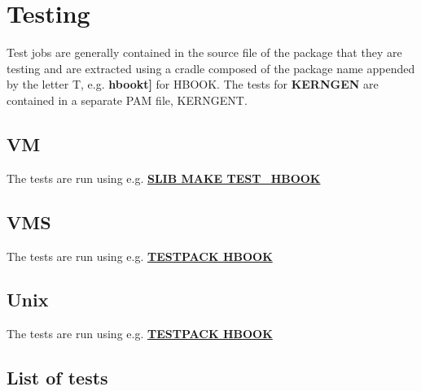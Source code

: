 \chapter{Testing}

Test jobs are generally contained in the source file of the
package that they are testing and are extracted using a
cradle composed of the package name appended by the letter T,
e.g. {\bf hbookt]} for HBOOK. The tests for {\bf KERNGEN}
are contained in a separate PAM file, KERNGENT.

\section{VM}

The tests are run using e.g. \underline{{\bf SLIB MAKE TEST\_HBOOK}}

\section{VMS}

The tests are run using e.g. \underline{{\bf TESTPACK HBOOK}}

\section{Unix}

The tests are run using e.g. \underline{{\bf TESTPACK HBOOK}}

\section{List of tests}

